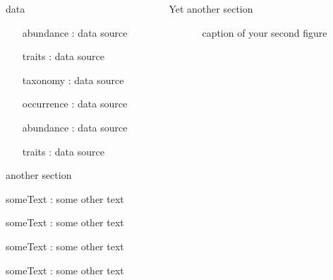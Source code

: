 \documentclass[final,hyperref={pdfpagelabels=false}]{beamer}
\begin{document}
\begin{frame}[t]
\begin{columns}[t]
\begin{column}{0.46\textwidth}
	\begin{block}{data}
		\begin{itemize}
		\setlength{\itemindent}{11em}
			\item[abundance]: data source
			\item[traits]: data source
			\item[taxonomy]: data source
		\end{itemize}

		\begin{itemize}
		\setlength{\itemindent}{11em}
			\item[occurrence]: data source
			\item[abundance]: data source
			\item[traits]: data source
		\end{itemize}
	\end{block}


\vspace{2cm}


	\begin{alertblock}{another section}
		\begin{itz}
		\setlength{\itemindent}{8em}
			\item[someText]: some other text
			\item[someText]: some other text
			\item[someText]: some other text
			\item[someText]: some other text						
		\end{itz}
	\end{alertblock}

\end{column} 













\begin{column}{0.02\textwidth}\end{column} %

\begin{column}{0.46\textwidth} 

	\begin{alertblock}{Yet another section }
		\begin{figure}
			\caption{ \ caption of your second figure }
		\end{figure}
	\end{alertblock}





\end{column}
\end{columns}
\end{frame}
\end{document}
